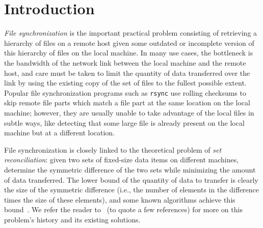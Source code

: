 \documentclass[11pt]{llncs}
\newcommand{\rsync}{\texttt{rsync}\xspace}
\begin{document}

\section{Introduction}

\emph{File synchronization} is the important practical problem consisting of
retrieving a hierarchy of files on a remote host given some outdated or
incomplete version of this hierarchy of files on the local machine. In many use
cases, the bottleneck is the bandwidth of the network link between the local machine
and the remote host, and care must be taken to limit the quantity of data
transferred over the link by using the existing copy of the set of files to the
fullest possible extent. Popular file synchronization programs such as \rsync
use rolling checksums to skip remote file parts which match a file part at the
same location on the local machine; however, they are usually unable to take
advantage of the local files in subtle ways, like detecting that some large file
is already present on the local machine but at a different location.

File synchronization is closely linked to the theoretical problem of \emph{set
reconciliation}: given two sets of fixed-size data items on different machines,
determine the symmetric difference of the two sets while minimizing the amount
of data transferred. The lower bound of the quantity of data to transfer is
clearly the size of the symmetric difference (i.e., the number of elements in the
difference times the size of these elements), and some known algorithms achieve
this bound~\cite{PSRec}. We refer the reader to~\cite{Whats,PSRec,Mins1} (to
quote a few references) for more on this problem's history and its existing
solutions.
\end{document}

